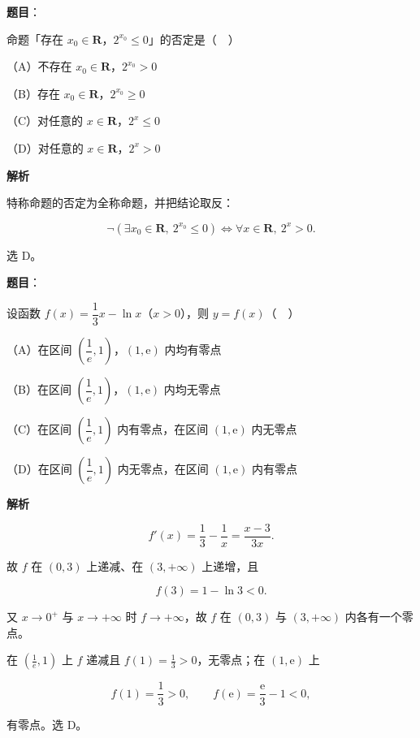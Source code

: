 \begin{answer}

\textbf{题目}：

命题「存在 $x_0\in\mathbf R$，$2^{x_0}\leqslant0$」的否定是（　）

（A）不存在 $x_0\in\mathbf R$，$2^{x_0}>0$

（B）存在 $x_0\in\mathbf R$，$2^{x_0}\geqslant0$

（C）对任意的 $x\in\mathbf R$，$2^x\leqslant0$

（D）对任意的 $x\in\mathbf R$，$2^x>0$

\textbf{解析}

特称命题的否定为全称命题，并把结论取反：

\nopagebreak[4]
\[\neg\left(\exists x_0\in\mathbf R,\ 2^{x_0}\leqslant0\right)
\iff \forall x\in\mathbf R,\ 2^x>0 .\]

选 D。


\end{answer}
\begin{answer}

\textbf{题目}：

设函数 $f(x)=\dfrac13x-\ln x$（$x>0$），则 $y=f(x)$（　）

（A）在区间 $\left(\dfrac1e,1\right)$，$(1,\mathrm e)$ 内均有零点

（B）在区间 $\left(\dfrac1e,1\right)$，$(1,\mathrm e)$ 内均无零点

（C）在区间 $\left(\dfrac1e,1\right)$ 内有零点，在区间 $(1,\mathrm e)$ 内无零点

（D）在区间 $\left(\dfrac1e,1\right)$ 内无零点，在区间 $(1,\mathrm e)$ 内有零点

\textbf{解析}

\nopagebreak[4]
\[f'(x)=\frac13-\frac1x=\frac{x-3}{3x}.\]

故 $f$ 在 $(0,3)$ 上递减、在 $(3,+\infty)$ 上递增，且

\nopagebreak[4]
\[f(3)=1-\ln3<0 .\]

又 $x\to0^+$ 与 $x\to+\infty$ 时 $f\to+\infty$，故 $f$ 在 $(0,3)$ 与 $(3,+\infty)$ 内各有一个零点。

在 $\left(\frac1e,1\right)$ 上 $f$ 递减且 $f(1)=\frac13>0$，无零点；在 $(1,\mathrm e)$ 上

\nopagebreak[4]
\[f(1)=\frac13>0,\qquad f(\mathrm e)=\frac{\mathrm e}{3}-1<0,\]

有零点。选 D。


\end{answer}

